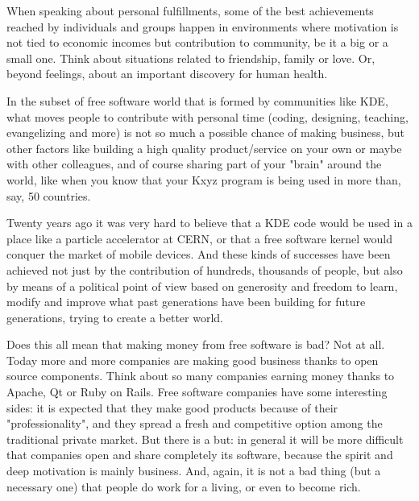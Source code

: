 


\noindent{}When speaking about personal fulfillments, some of the best achievements reached by individuals and groups happen in environments where motivation is not tied to economic incomes but contribution to community, be it a big or a small one. Think about situations related to friendship, family or love. Or, beyond feelings, about an important discovery for human health.

In the subset of free software world that is formed by communities like KDE, what moves people to contribute with personal time (coding, designing, teaching, evangelizing and more) is not so much a possible chance of making business, but other factors like building a high quality product/service on your own or maybe with other colleagues, and of course sharing part of your "brain" around the world, like when you know that your Kxyz program is being used in more than, say, 50 countries.

Twenty years ago it was very hard to believe that a KDE code would be used in a place like a particle accelerator at CERN, or that a free software kernel would conquer the market of mobile devices. And these kinds of successes have been achieved not just by the contribution of hundreds, thousands of people, but also by means of a political point of view based on generosity and freedom to learn, modify and improve what past generations have been building for future generations, trying to create a better world.

Does this all mean that making money from free software is bad? Not at all. Today more and more companies are making good business thanks to open source components. Think about so many companies earning money thanks to Apache, Qt or Ruby on Rails. Free software companies have some interesting sides: it is expected that they make good products because of their "professionality", and they spread a fresh and competitive option among the traditional private market. But there is a but: in general it will be more difficult that companies open and share completely its software, because the spirit and deep motivation is mainly business. And, again, it is not a bad thing (but a necessary one) that people do work for a living, or even to become rich.

